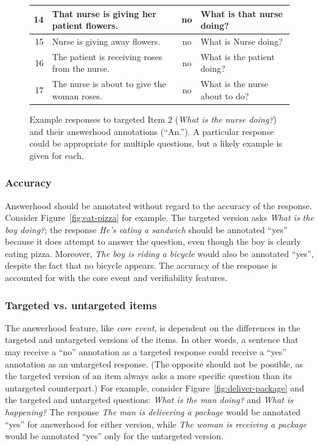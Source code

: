 \documentclass[12pt,notitlepage]{article}
\begin{document}
\begin{figure}[h!]
\begin{center}
\begin{tabular}{|r|l|c|l|}
\hline
14 & That nurse is giving her patient flowers. & no & What is that nurse doing? \\
\hline
15 & Nurse is giving away flowers. & no & What is Nurse doing? \\
\hline
16 & The patient is receiving roses from the nurse. & no & What is the patient doing?\\
\hline
17 & The nurse is about to give the woman roses. & no & What is the nurse about to do? \\
\hline
\end{tabular}
\end{center}
\caption{Example responses to targeted Item 2 (\textit{What is the nurse doing?}) and their answerhood annotations (``An.''). A particular response could be appropriate for multiple questions, but a likely example is given for each.}
\label{fig:answerhood-examples}
\end{figure}


\subsubsection{Accuracy} Answerhood should be annotated without regard to the accuracy of the response. Consider Figure~\ref{fig:eat-pizza} for example. The targeted version asks \textit{What is the boy doing?}; the response \textit{He's eating a sandwich} should be annotated ``yes'' because it does attempt to answer the question, even though the boy is clearly eating pizza. Moreover, \textit{The boy is riding a bicycle} would also be annotated ``yes'', despite the fact that no bicycle appears. The accuracy of the response is accounted for with the core event and verifiability features.

\subsubsection{Targeted vs. untargeted items} The answerhood feature, like \textit{core event}, is dependent on the differences in the targeted and untargeted versions of the items. In other words, a sentence that may receive a ``no'' annotation as a targeted response could receive a ``yes'' annotation as an untargeted response. (The opposite should not be possible, as the targeted version of an item always asks a more specific question than its untargeted counterpart.) For example, consider Figure~\ref{fig:deliver-package} and the targeted and untargeted questions: \textit{What is the man doing?} and \textit{What is happening?} The response \textit{The man is delivering a package} would be annotated ``yes'' for answerhood for either version, while \textit{The woman is receiving a package} would be annotated ``yes'' only for the untargeted version.
\end{document}
